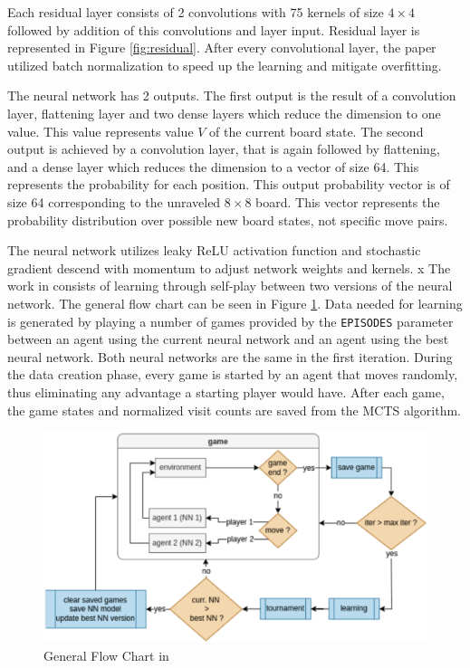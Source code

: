 Each residual layer consists of 2 convolutions with 75 kernels of size $4 \times 4$ followed by addition of this convolutions and layer input. Residual layer is represented in Figure \ref{fig:residual}. After every convolutional layer, the paper utilized batch normalization to speed up the learning and mitigate overfitting.

The neural network has 2 outputs. The first output is the result of a convolution layer, flattening layer and two dense layers which reduce the dimension to one value. This value represents value $V$ of the current board state. 
The second output is achieved by a convolution layer, that is again followed by flattening, and a dense layer which reduces the dimension to a vector of size 64. This represents the probability for each position. This output probability vector is of size 64 corresponding to the unraveled $8 \times 8$ board. This vector represents the probability distribution over possible new board states, not specific move pairs.

The neural network utilizes leaky ReLU activation function and stochastic gradient descend with momentum to adjust network weights and kernels.
x
The work in \cite{Popic_Boskovic_Brest_2021} consists of learning through self-play between two versions of the neural network. The general flow chart can be seen in Figure \ref{fig:self-play}. Data needed for learning is generated by playing a number of games provided by the \verb!EPISODES! parameter between an agent using the current neural network and an agent using the best neural network. Both neural networks are the same in the first iteration. During the data creation phase, every game is started by an agent that moves randomly, thus eliminating any advantage a starting player would have. After each game, the game states and normalized visit counts are saved from the MCTS algorithm.

\begin{figure}[htb]
    \centering
    \includegraphics[width=0.7\linewidth]{images/self-play.png}
    \caption{General Flow Chart in \cite{Popic_Boskovic_Brest_2021}}
    \label{fig:self-play}
\end{figure}

